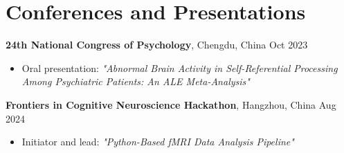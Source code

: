 \documentclass[letterpaper,11pt,oneside]{article}
\begin{document}
\section*{Conferences and Presentations}
\textbf{24th National Congress of Psychology}, Chengdu, China \hfill Oct 2023 \\
\begin{itemize}[leftmargin=*]
    \item Oral presentation: \textit{"Abnormal Brain Activity in Self-Referential Processing Among Psychiatric Patients: An ALE Meta-Analysis"}
\end{itemize}

\textbf{Frontiers in Cognitive Neuroscience Hackathon}, Hangzhou, China \hfill Aug 2024 \\
\begin{itemize}[leftmargin=*]
    \item Initiator and lead: \textit{"Python-Based fMRI Data Analysis Pipeline"}
\end{itemize}
\end{document}
